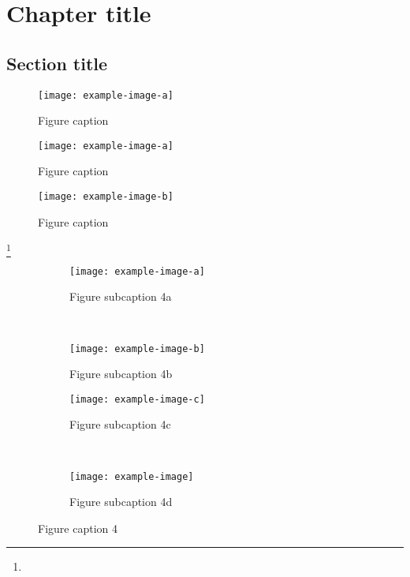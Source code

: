 \chapter{Chapter title}

\lipsum[1]

\section{Section title}

\lipsum[2]

\begin{figure}[htb]\centering
  \texttt{[image: example-image-a]}
\caption{Figure caption}
\label{f1}
\end{figure}

\lipsum[3-6]

\begin{figure}[htb]
\begin{minipage}[b]{0.48\textwidth}\centering
\texttt{[image: example-image-a]}
\caption{Figure caption}
\label{f2}
\end{minipage}
\hfill
\begin{minipage}[b]{0.48\textwidth}\centering
\texttt{[image: example-image-b]}
\caption{Figure caption}
\label{f3}
\end{minipage}
\end{figure}

\lipsum[1]\footnote{\lipsum[2]}

\lipsum[5]

\begin{figure}[htb]
    \centering
    \begin{subfigure}[t]{0.48\columnwidth}
        \centering
        \texttt{[image: example-image-a]}
\caption{Figure subcaption 4a}\label{f4a}
    \end{subfigure}%
~
    \begin{subfigure}[t]{0.48\columnwidth}
        \centering
	    \texttt{[image: example-image-b]}
        \caption{Figure subcaption 4b}        \label{f3b}
    \end{subfigure}
\medskip

    \begin{subfigure}[t]{0.48\columnwidth}
        \centering
	\texttt{[image: example-image-c]}
    \caption{Figure subcaption 4c}\label{f4c}
    \end{subfigure}%
~
    \begin{subfigure}[t]{0.48\columnwidth}
        \centering
	\texttt{[image: example-image]}
    \caption{Figure subcaption 4d}\label{f4d}
    \end{subfigure}
\caption{Figure caption 4}\label{f4}
 \end{figure}

